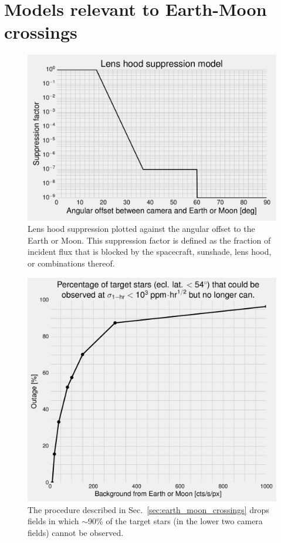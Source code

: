 \section{Models relevant to Earth-Moon crossings}
\label{sec:appendix}

\begin{figure}[!h] %
	\centering
	\includegraphics{figures/lens_hood_suppression.pdf}
	\caption{Lens hood suppression plotted against the angular offset to the Earth or Moon. This suppression factor is defined as the fraction of incident flux that is blocked by the spacecraft, sunshade, lens hood, or combinations thereof.}
	\label{fig:lens_hood_suppression}
\end{figure}
\newpage
\begin{figure}[!t] %
	\centering
	\includegraphics{figures/outage_vs_background.pdf}
	\caption{The procedure described in Sec.~\protect\ref{sec:earth_moon_crossings} drops fields in which $\sim$90\% of the target stars (in the lower two camera fields) cannot be observed.}
	\label{fig:outage_vs_background}
\end{figure}

